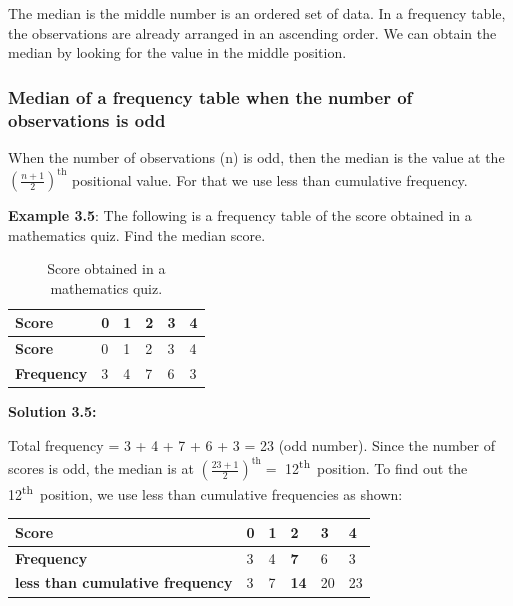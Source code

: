 \documentclass[
]{book}
\begin{document}
The median is the middle number is an ordered set of data. In a
frequency table, the observations are already arranged in an ascending
order. We can obtain the median by looking for the value in the middle
position.

\hypertarget{median-of-a-frequency-table-when-the-number-of-observations-is-odd}{%
\subsubsection{Median of a frequency table when the number of observations is odd}\label{median-of-a-frequency-table-when-the-number-of-observations-is-odd}}

When the number of observations (n) is odd, then the median is the value
at the~\(\left( \frac{n + 1}{2} \right)^{\text{th}}\) positional value.
For that we use less than cumulative frequency.

\textbf{Example 3.5}: The following is a frequency table of the score
obtained in a mathematics quiz. Find the median score.

\begin{longtable}[]{@{}llllll@{}}
\caption{\label{tab:score} Score obtained in a mathematics quiz.}\tabularnewline
\toprule\noalign{}
\textbf{Score} & 0 & 1 & 2 & 3 & 4 \\
\midrule\noalign{}
\endfirsthead
\toprule\noalign{}
\textbf{Score} & 0 & 1 & 2 & 3 & 4 \\
\midrule\noalign{}
\endhead
\bottomrule\noalign{}
\endlastfoot
\textbf{Frequency} & 3 & 4 & 7 & 6 & 3 \\
\end{longtable}

\textbf{Solution 3.5:}

Total frequency = 3 + 4 + 7 + 6 + 3 = 23 (odd number). Since the number
of scores is odd, the median is at
\(\left( \frac{23 + 1}{2} \right)^{\text{th}} =\) 12\textsuperscript{th}~position. To find
out the 12\textsuperscript{th}~position, we use less than cumulative frequencies as
shown:

\begin{longtable}[]{@{}llllll@{}}
\toprule\noalign{}
\textbf{Score} & 0 & 1 & \textbf{2} & 3 & 4 \\
\midrule\noalign{}
\endhead
\bottomrule\noalign{}
\endlastfoot
\textbf{Frequency} & 3 & 4 & \textbf{7} & 6 & 3 \\
\textbf{less than cumulative frequency} & 3 & 7 & \textbf{14} & 20 & 23 \\
\end{longtable}
\end{document}
